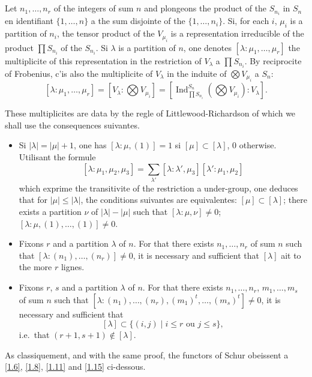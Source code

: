 \documentclass[11pt,a4paper]{article}
\theoremstyle{plain}
\theoremstyle{definition}
\DeclareMathOperator{\Ind}{Ind}
\begin{document}
\subsection{}\label{1.5}

Let $n_1,\ldots,n_r$ of the integers of sum $n$ and plongeons the product of the $S_{n_i}$ in $S_n$ en identifiant $\{1,\ldots,n\}$ a the sum disjointe of the $\{1,\ldots,n_i\}$. Si, for each $i$, $\mu_i$ is a partition of $n_i$, the tensor product of the $V_{\mu_i}$ is a representation irreducible of the product $\prod S_{n_i}$ of the $S_{n_i}$. Si $\lambda$ is a partition of $n$, one denotes $[\lambda:\mu_1,\ldots,\mu_r]$ the multiplicite of this representation in the restriction of $V_\lambda$ a $\prod S_{n_i}$. By reciprocite of Frobenius, c'is also the multiplicite of $V_\lambda$ in the induite of $\bigotimes V_{\mu_i}$ a $S_n$:
\[
[\lambda:\mu_1,\ldots,\mu_r]=[V_\lambda:\bigotimes V_{\mu_i}]=[\Ind^{S_n}_{\prod S_{n_i}}(\bigotimes V_{\mu_i}):V_\lambda].
\]

These multiplicites are data by the regle of Littlewood-Richardson of which we shall use the consequences suivantes.

\begin{itemize}
\item[(1.5.1)] Si $|\lambda|=|\mu|+1$, one has $[\lambda:\mu,(1)]=1$ si $[\mu]\subset[\lambda]$, $0$ otherwise. Utilisant the formule
\[
[\lambda:\mu_1,\mu_2,\mu_3]=\sum_{\lambda'}[\lambda:\lambda',\mu_3][\lambda':\mu_1,\mu_2]
\]
which exprime the transitivite of the restriction a under-group, one deduces that for $|\mu|\leq|\lambda|$, the conditions suivantes are equivalentes: $[\mu]\subset[\lambda]$; there exists a partition $\nu$ of $|\lambda|-|\mu|$ such that $[\lambda:\mu,\nu]\neq0$; $[\lambda:\mu,(1),\ldots,(1)]\neq0$.
\item[(1.5.2)] Fixons $r$ and a partition $\lambda$ of $n$. For that there exists $n_1,\ldots,n_r$ of sum $n$ such that $[\lambda:(n_1),\ldots,(n_r)]\neq0$, it is necessary and sufficient that $[\lambda]$ ait to the more $r$ lignes.
\item[(1.5.3)] Fixons $r$, $s$ and a partition $\lambda$ of $n$. For that there exists $n_1,\ldots,n_r$, $m_1,\ldots,m_s$ of sum $n$ such that $[\lambda:(n_1),\ldots,(n_r),(m_1)^t,\ldots,(m_s)^t]\neq0$, it is necessary and sufficient that
\[
[\lambda]\subset\{(i,j)\mid i\leq r\text{ ou }j\leq s\},
\]
i.e.~that $(r+1,s+1)\notin[\lambda]$.
\end{itemize}

As classiquement, and with the same proof, the functors of Schur obeissent a \ref{1.6}, \ref{1.8}, \ref{1.11} and \ref{1.15} ci-dessous.
\end{document}
